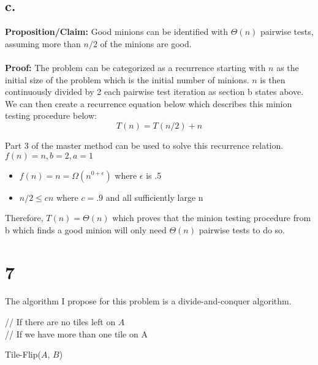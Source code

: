 \documentclass[12pt]{article}
\begin{document}
\subsection*{c.} 
\textbf{Proposition/Claim: } 
Good minions can be identified with $\Theta{(n)}$ pairwise tests, assuming more than $n/2$ of the minions are good.\\
\\
\textbf{Proof: }
The problem can be categorized as a recurrence starting with $n$ as the initial size of the problem which is the initial number of minions.  $n$ is then continuously divided by 2 each pairwise test iteration as section b states above.  We can then create a recurrence equation below which describes this minion testing procedure below:
\begin{equation}
T(n) = T(n/2) + n
\end{equation}

\noindent
Part 3 of the master method can be used to solve this recurrence relation.
$f(n) = n, b = 2, a = 1$
\begin{itemize}
\item $f(n) = n = \Omega{(n^{0+\epsilon})}$ where $\epsilon$ is .5
\item $n/2 \le cn$ where $c = .9$ and all sufficiently large n
\end{itemize}
Therefore, $T(n) = \Theta{(n)}$ which proves that the minion testing procedure from b which finds a good minion will only need $\Theta{(n)}$ pairwise tests to do so.

\section*{7}
The algorithm I propose for this problem is a divide-and-conquer algorithm.
\begin{algorithm}
\BlankLine
{}
\BlankLine
// If there are no tiles left on $A$\\
// If we have more than one tile on A\\
\caption{Tile-Flip($A$, $B$)}
\end{algorithm}
\noindent
\end{document}
